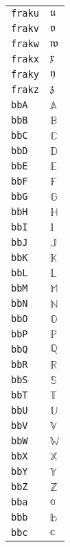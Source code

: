 \begin{longtable}{ll}
\texttt{fraku}&${}{\mathfrak{u}} {}$\\
\texttt{frakv}&${}{\mathfrak{v}} {}$\\
\texttt{frakw}&${}{\mathfrak{w}} {}$\\
\texttt{frakx}&${}{\mathfrak{x}} {}$\\
\texttt{fraky}&${}{\mathfrak{y}} {}$\\
\texttt{frakz}&${}{\mathfrak{z}} {}$\\
\texttt{bbA}&${}{\mathbb{A}}{}$\\
\texttt{bbB}&${}{\mathbb{B}}{}$\\
\texttt{bbC}&${}{\mathbb{C}}{}$\\
\texttt{bbD}&${}{\mathbb{D}}{}$\\
\texttt{bbE}&${}{\mathbb{E}}{}$\\
\texttt{bbF}&${}{\mathbb{F}}{}$\\
\texttt{bbG}&${}{\mathbb{G}}{}$\\
\texttt{bbH}&${}{\mathbb{H}}{}$\\
\texttt{bbI}&${}{\mathbb{I}}{}$\\
\texttt{bbJ}&${}{\mathbb{J}}{}$\\
\texttt{bbK}&${}{\mathbb{K}}{}$\\
\texttt{bbL}&${}{\mathbb{L}}{}$\\
\texttt{bbM}&${}{\mathbb{M}}{}$\\
\texttt{bbN}&${}{\mathbb{N}}{}$\\
\texttt{bbO}&${}{\mathbb{O}}{}$\\
\texttt{bbP}&${}{\mathbb{P}}{}$\\
\texttt{bbQ}&${}{\mathbb{Q}}{}$\\
\texttt{bbR}&${}{\mathbb{R}}{}$\\
\texttt{bbS}&${}{\mathbb{S}}{}$\\
\texttt{bbT}&${}{\mathbb{T}}{}$\\
\texttt{bbU}&${}{\mathbb{U}}{}$\\
\texttt{bbV}&${}{\mathbb{V}}{}$\\
\texttt{bbW}&${}{\mathbb{W}}{}$\\
\texttt{bbX}&${}{\mathbb{X}}{}$\\
\texttt{bbY}&${}{\mathbb{Y}}{}$\\
\texttt{bbZ}&${}{\mathbb{Z}}{}$\\
\texttt{bba}&${}{\mathbb{a}}{}$\\
\texttt{bbb}&${}{\mathbb{b}}{}$\\
\texttt{bbc}&${}{\mathbb{c}}{}$\\

\end{longtable}
